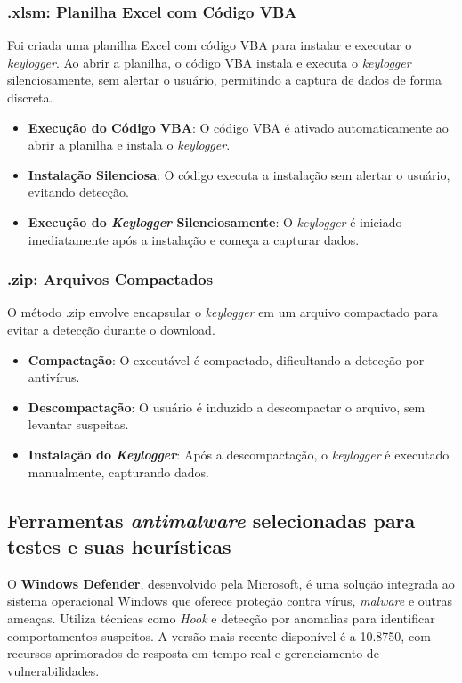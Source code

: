 \documentclass[12pt]{article}
\begin{document}
\subsubsection{.xlsm: Planilha Excel com Código VBA}

Foi criada uma planilha Excel com código VBA para instalar e executar o \textit{keylogger}. Ao abrir a planilha, o código VBA instala e executa o \textit{keylogger} silenciosamente, sem alertar o usuário, permitindo a captura de dados de forma discreta.

\begin{itemize}
    \item \textbf{Execução do Código VBA}: O código VBA é ativado automaticamente ao abrir a planilha e instala o \textit{keylogger}.
    \item \textbf{Instalação Silenciosa}: O código executa a instalação sem alertar o usuário, evitando detecção.
    \item \textbf{Execução do \textit{Keylogger} Silenciosamente}: O \textit{keylogger} é iniciado imediatamente após a instalação e começa a capturar dados.
\end{itemize}

\subsubsection{.zip: Arquivos Compactados}

O método .zip envolve encapsular o \textit{keylogger} em um arquivo compactado para evitar a detecção durante o download.

\begin{itemize}
    \item \textbf{Compactação}: O executável é compactado, dificultando a detecção por antivírus.
    \item \textbf{Descompactação}: O usuário é induzido a descompactar o arquivo, sem levantar suspeitas.
    \item \textbf{Instalação do \textit{Keylogger}}: Após a descompactação, o \textit{keylogger} é executado manualmente, capturando dados.
\end{itemize}

\subsection{Ferramentas \textit{antimalware} selecionadas para testes e suas heurísticas}

O \textbf{Windows Defender}, desenvolvido pela Microsoft, é uma solução integrada ao sistema operacional Windows que oferece proteção contra vírus, \textit{malware} e outras ameaças. Utiliza técnicas como \textit{Hook} e detecção por anomalias para identificar comportamentos suspeitos. A versão mais recente disponível é a 10.8750, com recursos aprimorados de resposta em tempo real e gerenciamento de vulnerabilidades.
\end{document}

